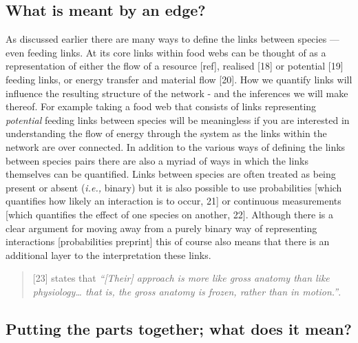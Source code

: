 \documentclass[
]{article}
\begin{document}
\subsection{What is meant by an edge?}\label{what-is-meant-by-an-edge}

As discussed earlier there are many ways to define the links between
species --- even feeding links. At its core links within food webs can
be thought of as a representation of either the flow of a resource
{[}ref{]}, realised {[}18{]} or potential {[}19{]} feeding links, or
energy transfer and material flow {[}20{]}. How we quantify links will
influence the resulting structure of the network - and the inferences we
will make thereof. For example taking a food web that consists of links
representing \emph{potential} feeding links between species will be
meaningless if you are interested in understanding the flow of energy
through the system as the links within the network are over connected.
In addition to the various ways of defining the links between species
pairs there are also a myriad of ways in which the links themselves can
be quantified. Links between species are often treated as being present
or absent (\emph{i.e.,} binary) but it is also possible to use
probabilities {[}which quantifies how likely an interaction is to occur,
21{]} or continuous measurements {[}which quantifies the effect of one
species on another, 22{]}. Although there is a clear argument for moving
away from a purely binary way of representing interactions
{[}probabilities preprint{]} this of course also means that there is an
additional layer to the interpretation these links.

\begin{quote}
{[}23{]} states that \emph{``{[}Their{]} approach is more like gross
anatomy than like physiology\ldots{} that is, the gross anatomy is
frozen, rather than in motion.''}.
\end{quote}

\subsection{Putting the parts together; what does it
mean?}\label{putting-the-parts-together-what-does-it-mean}
\end{document}
